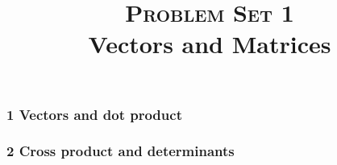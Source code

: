 \documentclass{report}
\title{\textsc{Problem Set 1}\\Vectors and Matrices}
\begin{document}
\maketitle

\part{}
\section*{1 Vectors and dot product}








\section*{2 Cross product and determinants}
%
%
%
%
%

\section*{}
\end{document}
